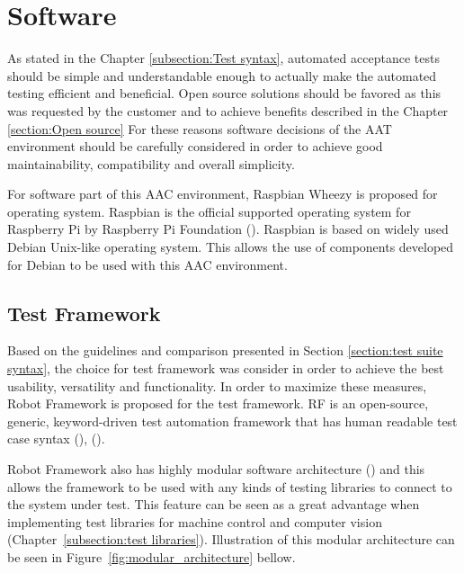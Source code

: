 \section{Software}
\label{section:software}

As stated in the Chapter \ref{subsection:Test syntax}, automated acceptance tests should be simple and understandable enough to actually make the automated testing efficient and beneficial. Open source solutions should be favored as this was requested by the customer and to achieve benefits described in the Chapter \ref{section:Open source} For these reasons software decisions of the AAT environment should be carefully considered in order to achieve good maintainability, compatibility and overall simplicity.

For software part of this AAC environment, Raspbian Wheezy is proposed for operating system. Raspbian is the official supported operating system for Raspberry Pi by Raspberry Pi Foundation (\emph{\cite{raspbian}}). Raspbian is based on widely used Debian Unix-like operating system. This allows the use of components developed for Debian to be used with this AAC environment.

\FloatBarrier
\subsection{Test Framework}
\label{subsection:test framework}

Based on the guidelines and comparison presented in Section \ref{section:test suite syntax}, the choice for test framework was consider in order to achieve the best usability, versatility and functionality. In order to maximize these measures, Robot Framework is proposed for the test framework. RF is an open-source, generic, keyword-driven test automation framework that has human readable test case syntax (\emph{\cite{Rfuserguide}}), (\emph{\cite{robotframework}}).

Robot Framework also has highly modular software architecture (\emph{\cite{Rfuserguide}}) and this allows the framework to be used with any kinds of testing libraries to connect to the system under test. This feature can be seen as a great advantage when implementing test libraries for machine control and computer vision (Chapter~\ref{subsection:test libraries}). Illustration of this modular architecture can be seen in Figure~\ref{fig:modular_architecture} bellow.

